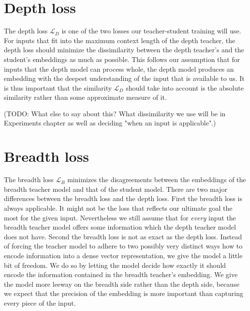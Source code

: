 \section{Depth loss}


The depth loss $\mathcal{L}_D$ is one of the two losses our teacher-student
training will use. For inputs that fit into the maximum context length of the
depth teacher, the depth loss should minimize the dissimilarity between the
depth teacher's and the student's embeddings as much as possible. This follows
our assumption that for inputs that the depth model can process whole, the depth
model produces an embedding with the deepest understanding of the input that is
available to us. It is thus important that the similarity $\mathcal{L}_D$ should
take into account is the absolute similarity rather than some approximate
measure of it.

(TODO: What else to say about this? What dissimilarity we use will be in
Experiments chapter as well as deciding "when an input is applicable".)


\section{Breadth loss}


The breadth loss $\mathcal{L}_B$ minimizes the disagreements between the
embeddings of the breadth teacher model {\Mb} and that of the student model.
There are two major differences between the breadth loss and the depth loss.
First the breadth loss is always applicable. It might not be the loss that
reflects our ultimate goal the most for the given input. Nevertheless we still
assume that for \emph{every} input the breadth teacher model offers some
information which the depth teacher model does not have. Second the breadth loss
is not as exact as the depth loss. Instead of forcing the teacher model to
adhere to two possibly very distinct ways how to encode information into a dense
vector representation, we give the model a little bit of freedom. We do so by
letting the model decide how exactly it should encode the information contained
in the breadth teacher's embedding. We give the model more leeway on the breadth
side rather than the depth side, because we expect that the precision of the
embedding is more important than capturing every piece of the input.

